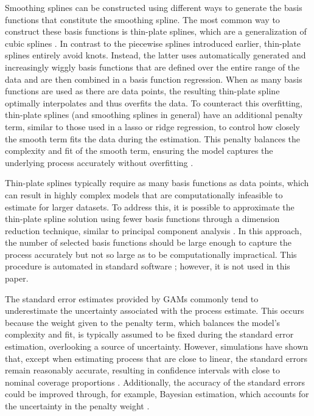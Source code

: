 \documentclass[man, floatsintext]{apa7}
\begin{document}
Smoothing splines can be constructed using different ways to generate the basis
functions that constitute the smoothing spline. The most common way to
construct these basis functions is thin-plate splines, which are a
generalization of cubic splines \parencite{wood_generalized_2006}. In contrast
to the piecewise splines introduced earlier, thin-plate splines entirely avoid
knots. Instead, the latter uses automatically generated and increasingly wiggly
basis functions that are defined over the entire range of the data and are then
combined in a basis function regression. When as many basis functions are used
as there are data points, the resulting thin-plate spline optimally
interpolates and thus overfits the data. To counteract this overfitting,
thin-plate splines (and smoothing splines in general) have an additional
penalty term, similar to those used in a lasso or ridge regression, to control
how closely the smooth term fits the data during the estimation. This penalty
balances the complexity and fit of the smooth term, ensuring the model captures
the underlying process accurately without overfitting
\parencite{gu_smoothing_2013, wahba_spline_1980}.

Thin-plate splines typically require as many basis functions as data points,
which can result in highly complex models that are computationally infeasible
to estimate for larger datasets. To address this, it is possible to approximate
the thin-plate spline solution using fewer basis functions through a dimension
reduction technique, similar to principal component analysis
\parencite{wood_thin_2003}. In this approach, the number of selected basis
functions should be large enough to capture the process accurately but not so
large as to be computationally impractical. This procedure is automated in
standard software \parencite{R-mgcv_a}; however, it is not used in this paper.

The standard error estimates provided by GAMs commonly tend to underestimate
the uncertainty associated with the process estimate. This occurs because the
weight given to the penalty term, which balances the model's complexity and
fit, is typically assumed to be fixed during the standard error estimation,
overlooking a source of uncertainty. However, simulations have shown that,
except when estimating process that are close to linear, the standard errors
remain reasonably accurate, resulting in confidence intervals with close to
nominal coverage proportions \parencite{marra_coverage_2012}. Additionally, the
accuracy of the standard errors could be improved through, for example,
Bayesian estimation, which accounts for the uncertainty in the penalty weight
\parencite{wood_generalized_2006}.
\end{document}
